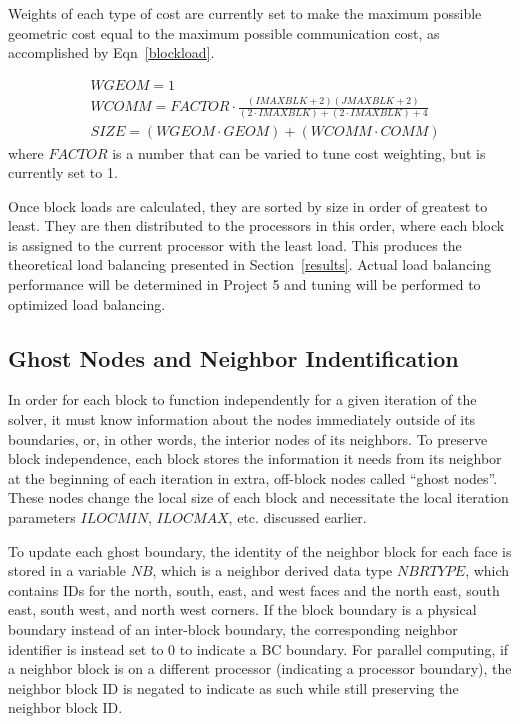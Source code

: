 \documentclass[twocolumn,10pt]{asme2ej}
\begin{document}
Weights of each type of cost are currently set to make the maximum possible geometric cost equal to the maximum possible communication cost, as accomplished by Eqn~\ref{blockload}.

\vspace{-1em}
\begin{equation}
\begin{split}
&WGEOM = 1 \\
&WCOMM = FACTOR \cdot \frac{(IMAXBLK+2)(JMAXBLK+2)}{(2 \cdot IMAXBLK)+(2 \cdot IMAXBLK)+4 } \\
&SIZE = (WGEOM \cdot GEOM) + (WCOMM \cdot COMM)
\end{split}
\label{blockload}
\end{equation}
\noindent where $FACTOR$ is a number that can be varied to tune cost weighting, but is currently set to 1.

Once block loads are calculated, they are sorted by size in order of greatest to least.  They are then distributed to the processors in this order, where each block is assigned to the current processor with the least load.  This produces the theoretical load balancing presented in Section~\ref{results}.  Actual load balancing performance will be determined in Project 5 and tuning will be performed to optimized load balancing.

\subsection{Ghost Nodes and Neighbor Indentification} \label{neighborsec}

In order for each block to function independently for a given iteration of the solver, it must know information about the nodes immediately outside of its boundaries, or, in other words, the interior nodes of its neighbors.  To preserve block independence, each block stores the information it needs from its neighbor at the beginning of each iteration in extra, off-block nodes called “ghost nodes”.  These nodes change the local size of each block and necessitate the local iteration parameters $ILOCMIN$, $ILOCMAX$, etc. discussed earlier.

To update each ghost boundary, the identity of the neighbor block for each face is stored in a variable $NB$, which is a neighbor derived data type $NBRTYPE$, which contains IDs for the north, south, east, and west faces and the north east, south east, south west, and north west corners.  If the block boundary is a physical boundary instead of an inter-block boundary, the corresponding neighbor identifier is instead set to 0 to indicate a BC boundary.  For parallel computing, if a neighbor block is on a different processor (indicating a processor boundary), the neighbor block ID is negated to indicate as such while still preserving the neighbor block ID.
\end{document}
